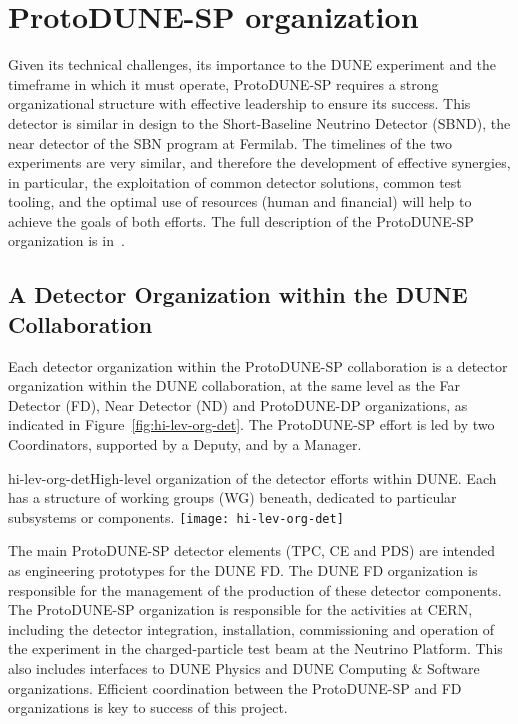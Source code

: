 
\section{ProtoDUNE-SP organization}

Given its technical challenges, its importance to the DUNE experiment and the timeframe in which it must operate, ProtoDUNE-SP requires a strong organizational structure with effective leadership to ensure its success. This detector is similar in design to the Short-Baseline Neutrino Detector (SBND), the near detector of the SBN %
program at Fermilab. The timelines of the two experiments are very similar, and therefore the development of effective synergies, in particular, the exploitation of common detector solutions, common test tooling, and the optimal use of resources (human and financial) will help to achieve the goals of both efforts.  The full description of the ProtoDUNE-SP organization is in~\cite{pdune-sp-org}.

\subsection{A Detector Organization within the DUNE Collaboration}

Each detector organization within the %
ProtoDUNE-SP collaboration is a detector organization within the DUNE collaboration, at the same level as the Far Detector (FD), Near Detector (ND) and ProtoDUNE-DP organizations, as indicated in Figure~\ref{fig:hi-lev-org-det}. The ProtoDUNE-SP effort is led by two Coordinators, supported by a Deputy, and by a Manager. 

\begin{cdrfigure}{hi-lev-org-det}{High-level organization of the detector efforts within DUNE. Each has a structure of working groups (WG) beneath, dedicated to particular subsystems or components.}
 \texttt{[image: hi-lev-org-det]}
\end{cdrfigure}

The main ProtoDUNE-SP detector elements (TPC, CE and PDS) are intended as engineering prototypes for the DUNE FD. The DUNE FD organization is responsible for the management of the production of these detector components. The ProtoDUNE-SP organization is responsible for the activities at CERN, including the detector integration, installation, commissioning and operation of the experiment in the charged-particle test beam at the Neutrino Platform.  This also includes interfaces to DUNE Physics and DUNE Computing \& Software organizations. Efficient coordination between the ProtoDUNE-SP and FD organizations is key to success of this project.


